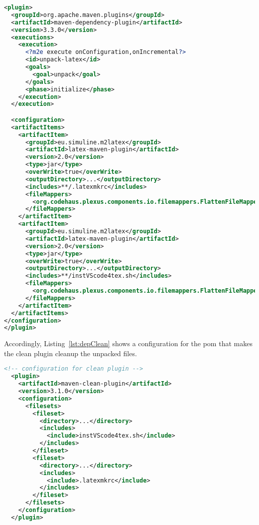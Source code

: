 \begin{lstlisting}[language=XML, basicstyle=\scriptsize,
  float, captionpos=b, label={lst:depUnpack}, 
  caption={Part of a pom describing installing files }]
  <plugin>
  <groupId>org.apache.maven.plugins</groupId>
  <artifactId>maven-dependency-plugin</artifactId>
  <version>3.3.0</version>
  <executions>
    <execution>
      <?m2e execute onConfiguration,onIncremental?>
      <id>unpack-latex</id>
      <goals>
        <goal>unpack</goal>
      </goals>
      <phase>initialize</phase>
    </execution>
  </execution>

  <configuration>
  <artifactItems>
    <artifactItem>
      <groupId>eu.simuline.m2latex</groupId>
      <artifactId>latex-maven-plugin</artifactId>
      <version>2.0</version>
      <type>jar</type>
      <overWrite>true</overWrite>
      <outputDirectory>...</outputDirectory>
      <includes>**/.latexmkrc</includes>
      <fileMappers>
        <org.codehaus.plexus.components.io.filemappers.FlattenFileMapper />
      </fileMappers>
    </artifactItem>
    <artifactItem>
      <groupId>eu.simuline.m2latex</groupId>
      <artifactId>latex-maven-plugin</artifactId>
      <version>2.0</version>
      <type>jar</type>
      <overWrite>true</overWrite>
      <outputDirectory>...</outputDirectory>
      <includes>**/instVScode4tex.sh</includes>
      <fileMappers>
        <org.codehaus.plexus.components.io.filemappers.FlattenFileMapper />
      </fileMappers>
    </artifactItem>
  </artifactItems>
</configuration>
</plugin>
\end{lstlisting}

Accordingly, Listing~\ref{lst:depClean} shows a configuration for the pom 
that makes the clean plugin cleanup the unpacked files. 


\begin{lstlisting}[language=XML, basicstyle=\scriptsize,
  float, captionpos=b, label={lst:depClean}, 
  caption={Part of a pom describing cleaning installed files }]
  <!-- configuration for clean plugin -->
  <plugin>
    <artifactId>maven-clean-plugin</artifactId>
    <version>3.1.0</version>
    <configuration>
      <filesets>
        <fileset>
          <directory>...</directory>
          <includes>
            <include>instVScode4tex.sh</include>
          </includes>
        </fileset>
        <fileset>
          <directory>...</directory>
          <includes>
            <include>.latexmkrc</include>
          </includes>
        </fileset>
      </filesets>
    </configuration>
  </plugin>
\end{lstlisting}

